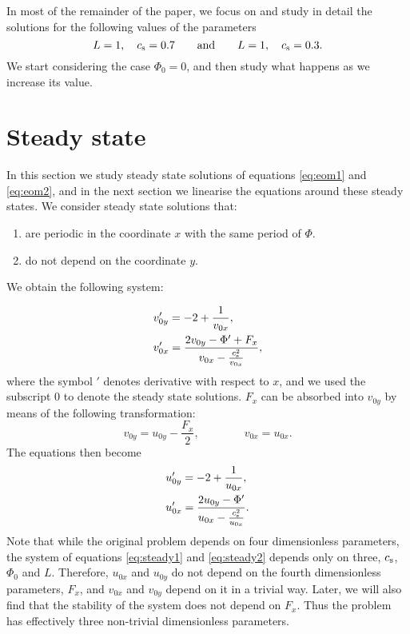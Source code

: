 \documentclass[useAMS,usenatbib]{mn2e}
\begin{document}
In most of the remainder of the paper, we focus on and study in detail the solutions for the following values of the parameters
%
\begin{equation}
L = 1, \quad c_{\rm s} = 0.7 \qquad \mathrm{and} \qquad L = 1, \quad c_{\rm s} = 0.3.
\end{equation}
%
We start considering the case $\Phi_0=0$, and then study what happens as we increase its value.


\section{Steady state} \label{sec:steady}

In this section we study steady state solutions of equations \eqref{eq:eom1} and \eqref{eq:eom2}, and in the next section we linearise the equations around these steady states. We consider steady state solutions that:
\begin{enumerate}
\item are periodic in the coordinate $x$ with the same period of $\Phi$.
\item do not depend on the coordinate $y$. 
\end{enumerate}
%
We obtain the following system:

\begin{align}
& v_{0y}' = -2 + \frac{1}{v_{0x}} \label{eq:s1a},\\
& v_{0x}' = \frac{ 2 v_{0y} - \Phi' + F_x}{ v_{0x} - \frac{c_{\rm s}^2}{v_{0x}}}, \label{eq:s1b}
\end{align}
where the symbol $'$ denotes derivative with respect to $x$, and we used the subscript $0$ to denote the steady state solutions.
$F_x$ can be absorbed into $v_{0y}$ by means of the following transformation:
\begin{equation}
v_{0y} =  u_{0y} - \frac{F_x}{2}, \qquad \qquad v_{0x}=u_{0x}. \label{eq:t1}
\end{equation}
The equations then become
\begin{align}
& u_{0y}' = -2 + \frac{1}{u_{0x}} \label{eq:steady1}, \\
& u_{0x}' = \frac{ 2 u_{0y} - \Phi'}{ u_{0x} - \frac{c_{\rm s}^2}{u_{0x}}}. \label{eq:steady2}
\end{align}
%
Note that while the original problem depends on four dimensionless parameters, the system of equations \eqref{eq:steady1} and \eqref{eq:steady2} depends only on three, $c_{\rm s}$, $\Phi_0$ and $L$. Therefore, $u_{0x}$ and $u_{0y}$ do not depend on the fourth dimensionless parameters, $F_x$, and $v_{0x}$ and $v_{0y}$ depend on it in a trivial way. Later, we will also find that the stability of the system does not depend on $F_x$. Thus the problem has effectively three non-trivial dimensionless parameters.
\end{document}
